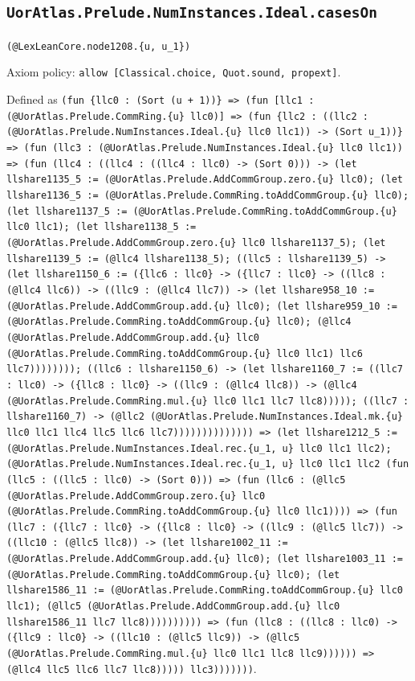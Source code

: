 \documentclass[11pt]{article}
\begin{document}
\subsection*{\texttt{UorAtlas.Prelude.NumInstances.Ideal.casesOn}}
\noindent\texttt{(@LexLeanCore.node1208.\{u, u\_1\})}\par
\noindent Axiom policy: \texttt{allow [Classical.choice, Quot.sound, propext]}.\par
\noindent Defined as \texttt{(fun \{llc0 : (Sort (u + 1))\} => (fun [llc1 : (@UorAtlas.Prelude.CommRing.\{u\} llc0)] => (fun \{llc2 : ((llc2 : (@UorAtlas.Prelude.NumInstances.Ideal.\{u\} llc0 llc1)) -> (Sort u\_1))\} => (fun (llc3 : (@UorAtlas.Prelude.NumInstances.Ideal.\{u\} llc0 llc1)) => (fun (llc4 : ((llc4 : ((llc4 : llc0) -> (Sort 0))) -> (let llshare1135\_5 := (@UorAtlas.Prelude.AddCommGroup.zero.\{u\} llc0); (let llshare1136\_5 := (@UorAtlas.Prelude.CommRing.toAddCommGroup.\{u\} llc0); (let llshare1137\_5 := (@UorAtlas.Prelude.CommRing.toAddCommGroup.\{u\} llc0 llc1); (let llshare1138\_5 := (@UorAtlas.Prelude.AddCommGroup.zero.\{u\} llc0 llshare1137\_5); (let llshare1139\_5 := (@llc4 llshare1138\_5); ((llc5 : llshare1139\_5) -> (let llshare1150\_6 := (\{llc6 : llc0\} -> (\{llc7 : llc0\} -> ((llc8 : (@llc4 llc6)) -> ((llc9 : (@llc4 llc7)) -> (let llshare958\_10 := (@UorAtlas.Prelude.AddCommGroup.add.\{u\} llc0); (let llshare959\_10 := (@UorAtlas.Prelude.CommRing.toAddCommGroup.\{u\} llc0); (@llc4 (@UorAtlas.Prelude.AddCommGroup.add.\{u\} llc0 (@UorAtlas.Prelude.CommRing.toAddCommGroup.\{u\} llc0 llc1) llc6 llc7)))))))); ((llc6 : llshare1150\_6) -> (let llshare1160\_7 := ((llc7 : llc0) -> (\{llc8 : llc0\} -> ((llc9 : (@llc4 llc8)) -> (@llc4 (@UorAtlas.Prelude.CommRing.mul.\{u\} llc0 llc1 llc7 llc8))))); ((llc7 : llshare1160\_7) -> (@llc2 (@UorAtlas.Prelude.NumInstances.Ideal.mk.\{u\} llc0 llc1 llc4 llc5 llc6 llc7)))))))))))))) => (let llshare1212\_5 := (@UorAtlas.Prelude.NumInstances.Ideal.rec.\{u\_1, u\} llc0 llc1 llc2); (@UorAtlas.Prelude.NumInstances.Ideal.rec.\{u\_1, u\} llc0 llc1 llc2 (fun (llc5 : ((llc5 : llc0) -> (Sort 0))) => (fun (llc6 : (@llc5 (@UorAtlas.Prelude.AddCommGroup.zero.\{u\} llc0 (@UorAtlas.Prelude.CommRing.toAddCommGroup.\{u\} llc0 llc1)))) => (fun (llc7 : (\{llc7 : llc0\} -> (\{llc8 : llc0\} -> ((llc9 : (@llc5 llc7)) -> ((llc10 : (@llc5 llc8)) -> (let llshare1002\_11 := (@UorAtlas.Prelude.AddCommGroup.add.\{u\} llc0); (let llshare1003\_11 := (@UorAtlas.Prelude.CommRing.toAddCommGroup.\{u\} llc0); (let llshare1586\_11 := (@UorAtlas.Prelude.CommRing.toAddCommGroup.\{u\} llc0 llc1); (@llc5 (@UorAtlas.Prelude.AddCommGroup.add.\{u\} llc0 llshare1586\_11 llc7 llc8)))))))))) => (fun (llc8 : ((llc8 : llc0) -> (\{llc9 : llc0\} -> ((llc10 : (@llc5 llc9)) -> (@llc5 (@UorAtlas.Prelude.CommRing.mul.\{u\} llc0 llc1 llc8 llc9)))))) => (@llc4 llc5 llc6 llc7 llc8))))) llc3)))))))}.\par
\end{document}
